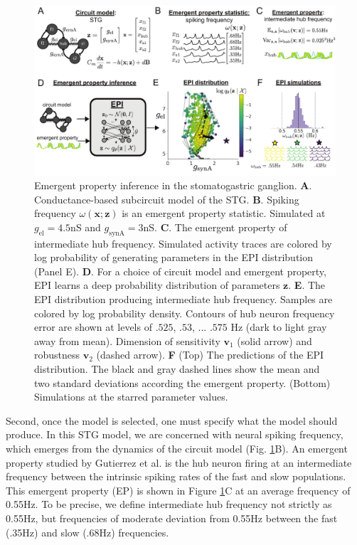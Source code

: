 \documentclass[11pt]{article}
\begin{document}
\begin{figure}
\begin{center}
\includegraphics[scale=0.8]{figures/fig1/fig1.pdf}
\end{center}
\caption{Emergent property inference in the stomatogastric ganglion.  
\textbf{A}. Conductance-based subcircuit model of the STG.
\textbf{B}. Spiking frequency $\omega(\mathbf{x}; \mathbf{z})$ is an emergent property statistic. 
Simulated at $g_{\text{el}} = 4.5$nS and $g_{\text{synA}} = 3$nS.
\textbf{C}. The emergent property of intermediate hub frequency.
Simulated activity traces are colored by log probability of generating parameters in the EPI distribution (Panel E).
\textbf{D}. For a choice of circuit model and emergent property, EPI learns a deep probability distribution of parameters $\mathbf{z}$.
\textbf{E}. The EPI distribution producing intermediate hub frequency.
Samples are colored by log probability density.  
Contours of hub neuron frequency error are shown at levels of $.525$, $.53$, ... $.575$ Hz (dark to light gray away from mean).
Dimension of sensitivity $\mathbf{v}_1$ (solid arrow) and robustness $\mathbf{v}_2$ (dashed arrow).
\textbf{F} (Top) The predictions of the EPI distribution.
The black and gray dashed lines show the mean and two standard deviations according the emergent property.
(Bottom) Simulations at the starred parameter values.
 }
 \label{fig:STG}
\end{figure}

Second, once the model is selected, one must specify what the model should produce.
In this STG model, we are concerned with neural spiking frequency, which emerges from the dynamics of the circuit model (Fig. \ref{fig:STG}B).
An emergent property studied by Gutierrez et al. is the hub neuron firing at an intermediate frequency between the intrinsic spiking rates of the fast and slow populations.
This emergent property (EP) is shown in Figure \ref{fig:STG}C at an average frequency of 0.55Hz.
To be precise, we define intermediate hub frequency not strictly as 0.55Hz, but frequencies of moderate deviation from 0.55Hz between the fast (.35Hz) and slow (.68Hz) frequencies.
\end{document}
